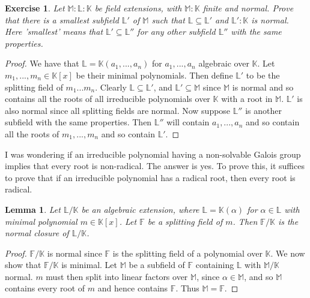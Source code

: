 \documentclass{article}
\newtheorem{lemma}[theorem]{Lemma}
\newtheorem{exercise}[theorem]{Exercise}
\begin{document}
\begin{exercise}
Let $\mathbb{M}:\mathbb{L}:\mathbb{K}$ be field extensions, with $\mathbb{M}:\mathbb{K}$ finite and normal. Prove that there is a smallest subfield $\mathbb{L}'$ of $\mathbb{M}$ such that $\mathbb{L}\subseteq\mathbb{L}'$ and $\mathbb{L}':\mathbb{K}$ is normal. Here 'smallest' means that $\mathbb{L}'\subseteq\mathbb{L}''$ for any other subfield $\mathbb{L}''$ with the same properties.
\end{exercise}
\begin{proof}
We have that $\mathbb{L}=\mathbb{K}(a_1,...,a_n)$ for $a_1,...,a_n$ algebraic over $\mathbb{K}$. Let $m_1,...,m_n\in\mathbb{K}[x]$ be their minimal polynomials. Then define $\mathbb{L}'$ to be the splitting field of $m_1...m_n$. Clearly $\mathbb{L}\subseteq\mathbb{L}'$, and $\mathbb{L}'\subseteq\mathbb{M}$ since $\mathbb{M}$ is normal and so contains all the roots of all irreducible polynomials over $\mathbb{K}$ with a root in $\mathbb{M}$. $\mathbb{L}'$ is also normal since all splitting fields are normal. Now suppose $\mathbb{L}''$ is another subfield with the same properties. Then $\mathbb{L}''$ will contain $a_1,...,a_n$ and so contain all the roots of $m_1,...,m_n$ and so contain $\mathbb{L}'$.
\end{proof}


I was wondering if an irreducible polynomial having a non-solvable Galois group implies that every root is non-radical. The answer is yes. To prove this, it suffices to prove that if an irreducible polynomial has a radical root, then every root is radical.

\begin{lemma}
Let $\mathbb{L}/\mathbb{K}$ be an algebraic extension, where $\mathbb{L}=\mathbb{K}(\alpha)$ for $\alpha\in\mathbb{L}$ with minimal polynomial $m\in\mathbb{K}[x]$. Let $\mathbb{F}$ be a splitting field of $m$. Then $\mathbb{F}/\mathbb{K}$ is the normal closure of $\mathbb{L}/\mathbb{K}$.
\end{lemma}
\begin{proof}
$\mathbb{F}/\mathbb{K}$ is normal since $\mathbb{F}$ is the splitting field of a polynomial over $\mathbb{K}$. We now show that $\mathbb{F}/\mathbb{K}$ is minimal. Let $\mathbb{M}$ be a subfield of $\mathbb{F}$ containing $\mathbb{L}$ with $\mathbb{M}/\mathbb{K}$ normal. $m$ must then split into linear factors over $\mathbb{M}$, since $\alpha\in\mathbb{M}$, and so $\mathbb{M}$ contains every root of $m$ and hence contains $\mathbb{F}$. Thus $\mathbb{M}=\mathbb{F}$.
\end{proof}
\end{document}
